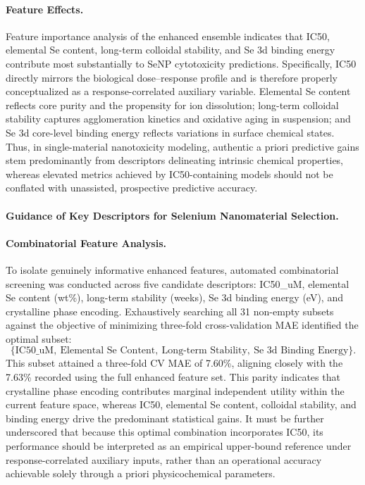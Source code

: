 \paragraph{Feature Effects.}
Feature importance analysis of the enhanced ensemble indicates that IC50, elemental Se content, long-term colloidal stability, and Se 3d binding energy contribute most substantially to SeNP cytotoxicity predictions. Specifically, IC50 directly mirrors the biological dose--response profile and is therefore properly conceptualized as a response-correlated auxiliary variable. Elemental Se content reflects core purity and the propensity for ion dissolution; long-term colloidal stability captures agglomeration kinetics and oxidative aging in suspension; and Se 3d core-level binding energy reflects variations in surface chemical states. Thus, in single-material nanotoxicity modeling, authentic a priori predictive gains stem predominantly from descriptors delineating intrinsic chemical properties, whereas elevated metrics achieved by IC50-containing models should not be conflated with unassisted, prospective predictive accuracy.

\paragraph{Guidance of Key Descriptors for Selenium Nanomaterial Selection.}

\paragraph{Combinatorial Feature Analysis.}
To isolate genuinely informative enhanced features, automated combinatorial screening was conducted across five candidate descriptors: IC50\_uM, elemental Se content (wt\%), long-term stability (weeks), Se 3d binding energy (eV), and crystalline phase encoding. Exhaustively searching all 31 non-empty subsets against the objective of minimizing three-fold cross-validation MAE identified the optimal subset:
\[
\{\text{IC50\_uM},\ \text{Elemental Se Content},\ \text{Long-term Stability},\ \text{Se 3d Binding Energy}\}.
\]
This subset attained a three-fold CV MAE of 7.60\%, aligning closely with the 7.63\% recorded using the full enhanced feature set. This parity indicates that crystalline phase encoding contributes marginal independent utility within the current feature space, whereas IC50, elemental Se content, colloidal stability, and binding energy drive the predominant statistical gains. It must be further underscored that because this optimal combination incorporates IC50, its performance should be interpreted as an empirical upper-bound reference under response-correlated auxiliary inputs, rather than an operational accuracy achievable solely through a priori physicochemical parameters.

